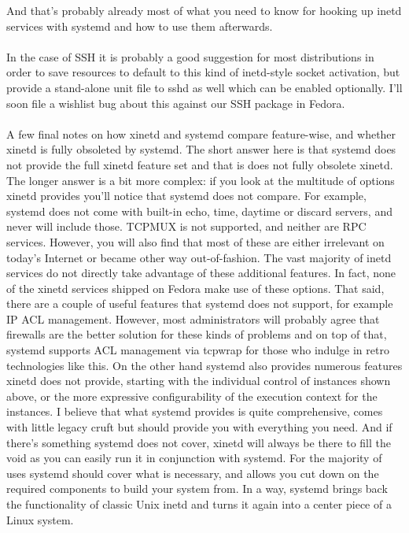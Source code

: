 \documentclass[titlepage]{article}
\begin{document}
And that's probably already most of what you need to know for hooking up inetd services with systemd and how to use them afterwards.
\\
\\
In the case of SSH it is probably a good suggestion for most distributions in order to save resources to default to this kind of inetd-style socket activation, but provide a stand-alone unit file to sshd as well which can be enabled optionally. I'll soon file a wishlist bug about this against our SSH package in Fedora.
\\
\\
A few final notes on how xinetd and systemd compare feature-wise, and whether xinetd is fully obsoleted by systemd. The short answer here is that systemd does not provide the full xinetd feature set and that is does not fully obsolete xinetd. The longer answer is a bit more complex: if you look at the multitude of options xinetd provides you'll notice that systemd does not compare. For example, systemd does not come with built-in echo, time, daytime or discard servers, and never will include those. TCPMUX is not supported, and neither are RPC services. However, you will also find that most of these are either irrelevant on today's Internet or became other way out-of-fashion. The vast majority of inetd services do not directly take advantage of these additional features. In fact, none of the xinetd services shipped on Fedora make use of these options. That said, there are a couple of useful features that systemd does not support, for example IP ACL management. However, most administrators will probably agree that firewalls are the better solution for these kinds of problems and on top of that, systemd supports ACL management via tcpwrap for those who indulge in retro technologies like this. On the other hand systemd also provides numerous features xinetd does not provide, starting with the individual control of instances shown above, or the more expressive configurability of the execution context for the instances. I believe that what systemd provides is quite comprehensive, comes with little legacy cruft but should provide you with everything you need. And if there's something systemd does not cover, xinetd will always be there to fill the void as you can easily run it in conjunction with systemd. For the majority of uses systemd should cover what is necessary, and allows you cut down on the required components to build your system from. In a way, systemd brings back the functionality of classic Unix inetd and turns it again into a center piece of a Linux system.
\end{document}
